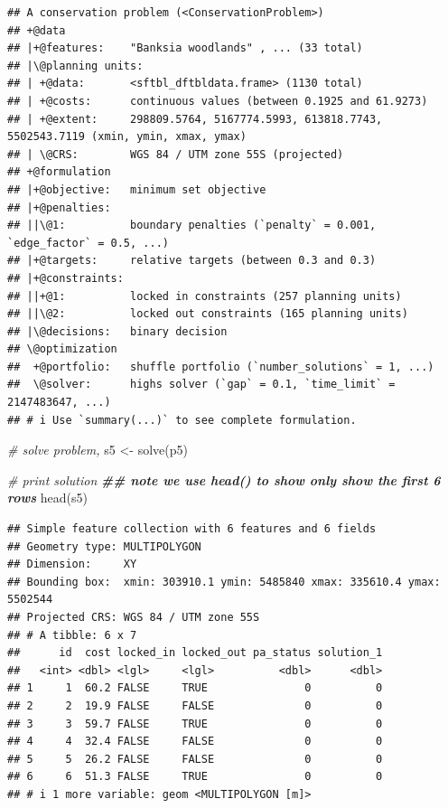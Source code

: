 \documentclass[
  12pt,
]{book}
\newenvironment{Shaded}{\begin{snugshade}}{\end{snugshade}}
\newcommand{\CommentTok}[1]{\textcolor[rgb]{0.56,0.35,0.01}{\textit{#1}}}
\newcommand{\DocumentationTok}[1]{\textcolor[rgb]{0.56,0.35,0.01}{\textbf{\textit{#1}}}}
\newcommand{\FunctionTok}[1]{\textcolor[rgb]{0.00,0.00,0.00}{#1}}
\newcommand{\NormalTok}[1]{#1}
\newcommand{\OtherTok}[1]{\textcolor[rgb]{0.56,0.35,0.01}{#1}}
\begin{document}
\begin{verbatim}
## A conservation problem (<ConservationProblem>)
## +@data
## |+@features:    "Banksia woodlands" , ... (33 total)
## |\@planning units:
## | +@data:       <sftbl_dftbldata.frame> (1130 total)
## | +@costs:      continuous values (between 0.1925 and 61.9273)
## | +@extent:     298809.5764, 5167774.5993, 613818.7743, 5502543.7119 (xmin, ymin, xmax, ymax)
## | \@CRS:        WGS 84 / UTM zone 55S (projected)
## +@formulation
## |+@objective:   minimum set objective
## |+@penalties:
## ||\@1:          boundary penalties (`penalty` = 0.001, `edge_factor` = 0.5, ...)
## |+@targets:     relative targets (between 0.3 and 0.3)
## |+@constraints:
## ||+@1:          locked in constraints (257 planning units)
## ||\@2:          locked out constraints (165 planning units)
## |\@decisions:   binary decision
## \@optimization
##  +@portfolio:   shuffle portfolio (`number_solutions` = 1, ...)
##  \@solver:      highs solver (`gap` = 0.1, `time_limit` = 2147483647, ...)
## # i Use `summary(...)` to see complete formulation.
\end{verbatim}

\begin{Shaded}
\begin{Highlighting}[]
\CommentTok{\# solve problem,}
\NormalTok{s5 }\OtherTok{\textless{}{-}} \FunctionTok{solve}\NormalTok{(p5)}

\CommentTok{\# print solution}
\DocumentationTok{\#\# note we use head() to show only show the first 6 rows}
\FunctionTok{head}\NormalTok{(s5)}
\end{Highlighting}
\end{Shaded}

\begin{verbatim}
## Simple feature collection with 6 features and 6 fields
## Geometry type: MULTIPOLYGON
## Dimension:     XY
## Bounding box:  xmin: 303910.1 ymin: 5485840 xmax: 335610.4 ymax: 5502544
## Projected CRS: WGS 84 / UTM zone 55S
## # A tibble: 6 x 7
##      id  cost locked_in locked_out pa_status solution_1
##   <int> <dbl> <lgl>     <lgl>          <dbl>      <dbl>
## 1     1  60.2 FALSE     TRUE               0          0
## 2     2  19.9 FALSE     FALSE              0          0
## 3     3  59.7 FALSE     TRUE               0          0
## 4     4  32.4 FALSE     FALSE              0          0
## 5     5  26.2 FALSE     FALSE              0          0
## 6     6  51.3 FALSE     TRUE               0          0
## # i 1 more variable: geom <MULTIPOLYGON [m]>
\end{verbatim}
\end{document}
